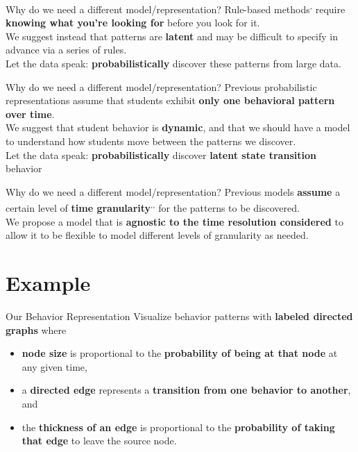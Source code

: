 \documentclass[10pt]{beamer}
\begin{document}
\begin{frame}{Why do we need a different model/representation?}
    Rule-based
    methods\textsuperscript{,}
    require \textbf{knowing what you're looking for} before you look for
    it.
    \\[\baselineskip]
    We suggest instead that patterns are \textbf{latent} and may be
    difficult to specify in advance via a series of rules.
    \\[\baselineskip]
    Let the data speak: \textbf{probabilistically} discover these patterns
    from large data.
\end{frame}

\begin{frame}{Why do we need a different model/representation?}
  Previous probabilistic representations
  assume that students exhibit \textbf{only one behavioral pattern over
  time}.
  \\[\baselineskip]
  We suggest that student behavior is \textbf{dynamic}, and that we should
  have a model to understand how students move between the patterns we
  discover.
  \\[\baselineskip]
  Let the data speak: \textbf{probabilistically} discover \textbf{latent
  state transition} behavior
\end{frame}

\begin{frame}{Why do we need a different model/representation?}
  Previous models \textbf{assume} a certain level of \textbf{time
  granularity}\textsuperscript{,}\textsuperscript{,}
  for the patterns to be discovered.
  \\[\baselineskip]
  We propose a model that is \textbf{agnostic to the time resolution
  considered} to allow it to be flexible to model different levels of
  granularity as needed.
\end{frame}

\section{Example}

\begin{frame}{Our Behavior Representation}
  Visualize behavior patterns with \textbf{labeled directed graphs} where
  \begin{itemize}
      \item \textbf{node size} is proportional to the \textbf{probability
          of being at that node} at any given time,
          \\[\baselineskip]
      \item a \textbf{directed edge} represents a \textbf{transition from one behavior to
          another}, and
          \\[\baselineskip]
      \item the \textbf{thickness of an edge} is proportional to the
          \textbf{probability of taking that edge} to leave the source node.
  \end{itemize}
\end{frame}
\end{document}
